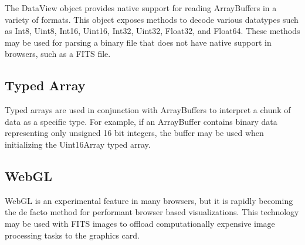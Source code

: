 The DataView \citep{KhronosTypedArray} object provides native support for reading ArrayBuffers in a variety of formats.  This object exposes methods to decode various datatypes such as Int8, Uint8, Int16, Uint16, Int32, Uint32, Float32, and Float64.  These methods may be used for parsing a binary file that does not have native support in browsers, such as a FITS file.

\subsection{Typed Array}

Typed arrays \citep{KhronosTypedArray} are used in conjunction with ArrayBuffers to interpret a chunk of data as a specific type.  For example, if an ArrayBuffer contains binary data representing only unsigned 16 bit integers, the buffer may be used when initializing the Uint16Array typed array.

\subsection{WebGL}

WebGL \citep{KhronosWebGL} is an experimental feature in many browsers, but it is rapidly becoming the de facto method for performant browser based visualizations.  This technology may be used with FITS images to offload computationally expensive image processing tasks to the graphics card.


